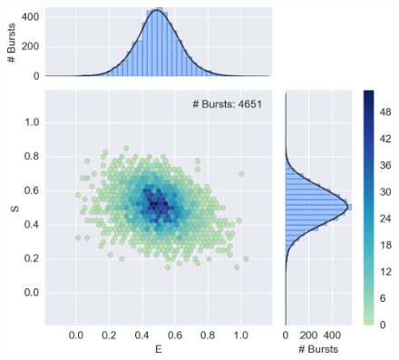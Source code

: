 \begin{figure}
\begin{center}
\includegraphics[width=\singlefig]{"figures/alex_jointplot_fretsel/alex_jointplot_fretsel"}
\caption[]{}
\end{center}
\end{figure}














